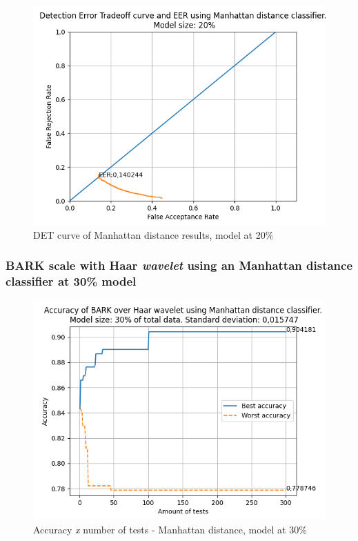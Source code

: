 			\begin{figure}[H]
				\centering
				\includegraphics[scale=.6]{images/results/det/DET_for_classifier_Manhattan_20}
				\caption{DET curve of Manhattan distance results, model at 20\%}
				\label{fig:detforclassifiermanhattan20}
			\end{figure}

			
		
		\subsubsection{BARK scale with Haar \textit{wavelet} using an Manhattan distance classifier at 30\% model}
		
			\begin{figure}[H]
				\centering
				\includegraphics[scale=.6]{images/results/confusionMatrices/classifier_Manhattan_30.png}
				\caption{Accuracy \textit{x} number of tests - Manhattan distance, model at 30\%}
				\label{fig:classifiermanhattan30}
			\end{figure}
			
